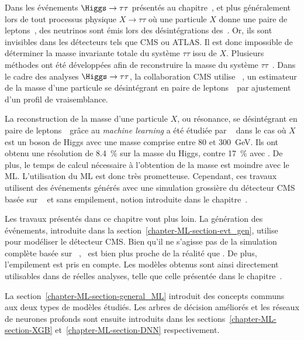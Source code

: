 \par
Dans les événements $\Higgs\to\tau\tau$ présentés au chapitre~,
et plus généralement lors de tout processus physique $X\to\tau\tau$ où une particule $X$ donne une paire de leptons~\tau,
des neutrinos sont émis lors des désintégrations des~\tau.
Or, ils sont invisibles dans les détecteurs tels que CMS ou ATLAS.
Il est donc impossible de déterminer la masse invariante totale du système $\tau\tau$ issu de $X$.
Plusieurs méthodes ont été développées afin de reconstruire la masse du système $\tau\tau$~\cite{ELAGIN2011481,Barr_2011,Gripaios_2013}.
Dans le cadre des analyses $\Higgs\to\tau\tau$, la collaboration CMS utilise \SVFIT~\cite{SVFit_Bianchini_2014},
un estimateur de la masse d'une particule se désintégrant en paire de leptons~\tau\ par ajustement d'un profil de vraisemblance.
\par
La reconstruction de la masse d'une particule $X$, ou résonance, se désintégrant en paire de leptons~\tau\ grâce au \emph{machine learning}
a été étudiée par \citeauthor{BARTSCHI201929}~\cite{BARTSCHI201929} dans le cas où $X$ est un boson de Higgs avec une masse comprise entre \num{80} et \SI{300}{\GeV}.
Ils ont obtenu une résolution de \SI{8.4}{\%} sur la masse du Higgs, contre \SI{17}{\%} avec \SVFIT.
De plus, le temps de calcul nécessaire à l'obtention de la masse est moindre avec le ML.
L'utilisation du ML est donc très prometteuse.
Cependant,
ces travaux utilisent des événements générés
avec une simulation grossière du détecteur CMS basée sur
\DELPHES~\cite{Delphes,Delphes_additions}
et sans empilement, notion introduite dans le chapitre~.
\par
Les travaux présentés dans ce chapitre vont plus loin.
La génération des événements, introduite dans la section~\ref{chapter-ML-section-evt_gen},
utilise \FASTSIM~\cite{FastSim_2011,FastSim_2014,FastSim_2017_1,FastSim_2017_2}
pour modéliser le détecteur CMS.
Bien qu'il ne s'agisse pas de la simulation complète basée sur \GEANTfour~\cite{geant4_2003,geant4_2006,geant4_2016},
\FASTSIM\ est bien plus proche de la réalité que \DELPHES.
De plus, l'empilement est pris en compte.
Les modèles obtenus sont ainsi directement utilisables dans de réelles analyses, telle que celle présentée dans le chapitre~.
\par
La section~\ref{chapter-ML-section-general_ML} introduit des concepts communs aux deux types de modèles étudiés.
Les arbres de décision améliorés et les réseaux de neurones profonds sont ensuite introduits dans les sections~\ref{chapter-ML-section-XGB} et~\ref{chapter-ML-section-DNN} respectivement.
